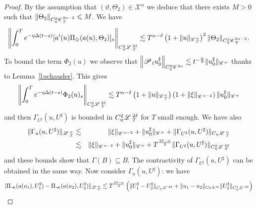 \documentclass[11pt,reqno]{amsart}
\newcommand{\nocomma}{}
\newcommand{\precprec}{\prec\!\!\!\prec}
\newcommand{\CC}{\mathscr{C} \hspace{.1em}}
\newcommand{\LL}{\mathscr{L} \hspace{.2em}}
\newcommand{\PP}{\mathscr{P} \hspace{.1em}}
\begin{document}
\begin{proof}
  By the assumption that $(\vartheta, \Theta_2) \in \mathcal{X}^{\alpha}$ we
  deduce that there exists $M > 0$ such that $\| \Theta_2 \|_{C_{\eta}^2
  \CC_T^{2 \alpha - 2}} \leqslant M$. We have
  \[ \left\| \int_0^T e^{- \eta \Delta (t - s)} [a' (u) \Pi_{\nocomma
     \diamondsuit} (a (u), \Theta_2)]_s \right\|_{C^2_{\eta} \LL_T^{2 \delta}}
     \lesssim T^{\alpha - \delta} \left( 1 + \| u \|_{\CC^{\alpha}_T}
     \right)^2 \| \Theta_2 \|_{C_{\eta}^2 \CC_T^{2 \alpha - 2}} . \]
  To bound the term $\Phi_2 (u)$ we observe that $\left\| \PP_t u^{\sharp}_0
  \right\|_{C_{\eta}^2 \CC^{2 \alpha}} \lesssim t^{- \frac{\alpha}{2}} \|
  u^{\sharp}_0 \|_{\CC^{\alpha}}$ thanks to Lemma~\ref{l:schauder}. This gives
  \[ \left\| \int_0^T e^{- \eta \Delta (t - s)} \Phi_2 (u)_s
     \right\|_{C^2_{\eta} \LL_T^{2 \delta}} \lesssim T^{\alpha - \delta}
     \left( 1 + \| u \|_{\CC^{\alpha}_T} \right) \left( 1 + \| \xi
     \|_{\CC^{\alpha - 2}} \right) \| u^{\sharp}_0 \|_{\CC^{\alpha}} \]
  and then $\Gamma_{U^{\sharp}} (u, U^{\sharp})$ is bounded in $C^2_{\eta}
  \LL_T^{2 \delta}$ for $T$ small enough. We have also
  \begin{eqnarray*}
    \| \Gamma_u (u, U^{\sharp}) \|_{\LL^{\alpha}_T} & \lesssim & \| \xi
    \|_{\CC^{\alpha - 2}} + \| u^{\sharp}_0 \|_{\CC^{\alpha}} + \|
    \Gamma_{U^{\sharp}} (u, U^{\sharp}) \|_{C_{\eta} \LL_T^{\alpha}}\\
    & \lesssim & \| \xi \|_{\CC^{\alpha - 2}} + \| u^{\sharp}_0
    \|_{\CC^{\alpha}} + T^{\frac{2 \delta - \alpha}{2}} \| \Gamma_{U^{\sharp}}
    (u, U^{\sharp}) \|_{C^2_{\eta} \LL_T^{2 \delta}}
  \end{eqnarray*}
  and these bounds show that $\Gamma (B) \subseteq B$. The contractivity of
  $\Gamma_{U^{\sharp}} (u, U^{\sharp})$ can be obtained in the same way. Now
  consider $\Gamma_u (u, U^{\sharp})$: we have
  \begin{equation*}
  | \Pi_{\precprec} (a (u_1), U_1^{\sharp}) - \Pi_{\precprec} (a
    (u_2), U_2^{\sharp}) \|_{\LL^{\alpha}_T}
     \lesssim  T^{\frac{2 \delta - \alpha}{2}} \left( \| U^{\sharp}_1 -
    U^{\sharp}_2 \|_{C_{\eta} \LL^{2 \delta}} + \| u_1 - u_2 \|_{C_T
    L^{\infty}} \| U^{\sharp}_2 \|_{C_{\eta}^1 \LL^{2 \delta}} \right)
  \end{equation*}

\end{proof}
\end{document}

